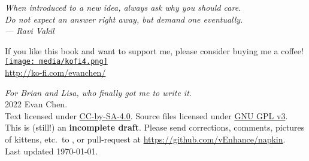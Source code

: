 \begin{titlepage}
	\vspace*{3cm}
	\begin{flushright}
		\large\itshape
		When introduced to a new idea, always ask why you should care. \\[0.2cm]
		Do not expect an answer right away, but demand one eventually. \\[0.8cm]
		--- Ravi Vakil \cite{ref:vakil}
	\end{flushright}

	\vspace*{8em}
	\hrulebar

	\begin{center}
	\begin{minipage}{50ex}
		\centering
		If you like this book and want to support me,
		please consider buying me a coffee! \\[2ex]
		\href{http://ko-fi.com/evanchen}{\texttt{[image: media/kofi4.png]}} \\
		\url{http://ko-fi.com/evanchen/}
	\end{minipage}
	\end{center}
	
	\vfill
	{
	\small
	\noindent \emph{For Brian and Lisa, who finally got me to write it}. \\[0.4cm]
	\noindent {\copyright} 2022 Evan Chen. \\
	Text licensed under
	\href{https://creativecommons.org/licenses/by-sa/4.0/}{CC-by-SA-4.0}.
	Source files licensed under
	\href{https://choosealicense.com/licenses/gpl-3.0/}{GNU GPL v3}.
	\\[0.4cm]
	This is (still!) an \textbf{incomplete draft}.
	Please send corrections, comments, pictures of kittens,
	etc.\ to ,
	or pull-request at \url{https://github.com/vEnhance/napkin}.
	\\[0.4cm]
	\noindent Last updated \today.
	\vspace*{1cm}
	}
\end{titlepage}
